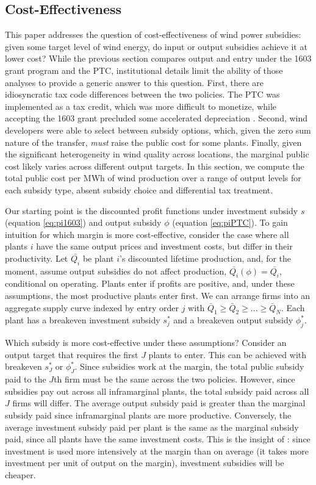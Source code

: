 \documentclass[12pt]{article}
\begin{document}
\subsection{Cost-Effectiveness \label{sec:costEffectiveness}}

This paper addresses the question of cost-effectiveness of wind power subsidies: given some target level of wind energy, do input or output subsidies achieve it at lower cost? While the previous section compares output and entry under the 1603 grant program and the PTC, institutional details limit the ability of those analyses to provide a generic answer to this question. First, there are idiosyncratic tax code differences between the two policies. The PTC was implemented as a tax credit, which was more difficult to monetize, while accepting the 1603 grant precluded some accelerated depreciation \citep{johnston_nonrefundable_2019}. Second, wind developers were able to select between subsidy options, which, given the zero sum nature of the transfer, \emph{must} raise the public cost for some plants. Finally, given the significant heterogeneity in wind quality across locations, the marginal public cost likely varies across different output targets. In this section, we compute the total public cost per MWh of wind production over a range of output levels for each subsidy type, absent subsidy choice and differential tax treatment. 

Our starting point is the discounted profit functions under investment subsidy $s$ (equation \ref{eq:pi1603}) and output subsidy $\phi$ (equation \ref{eq:piPTC}). To gain intuition for which margin is more cost-effective, consider the case where all plants $i$ have the same output prices and investment costs, but differ in their productivity. Let $\bar{Q_i}$ be plant $i$'s discounted lifetime production, and, for the moment, assume output subsidies do not affect production, $\bar{Q_i}(\phi) = \bar{Q_i}$, conditional on operating. Plants enter if profits are positive, and, under these assumptions, the most productive plants enter first. We can arrange firms into an aggregate supply curve indexed by entry order $j$ with $\bar{Q}_{1} \ge \bar{Q}_{2} \ge ... \ge \bar{Q}_{N}$. Each plant has a breakeven investment subsidy $s^*_j$ and a breakeven output subsidy $\phi^*_j$.

Which subsidy is more cost-effective under these assumptions? Consider an output target that requires the first $J$ plants to enter. This can be achieved with breakeven $s^*_J$ or $\phi^*_J$. Since subsidies work at the margin, the total public subsidy paid to the $J$th firm must be the same across the two policies. However, since subsidies pay out across all inframarginal plants, the total subsidy paid across all $J$ firms will differ. The average output subsidy paid is greater than the marginal subsidy paid since inframarginal plants are more productive. Conversely, the average investment subsidy paid per plant is the same as the marginal subsidy paid, since all plants have the same investment costs. This is the insight of \citet{parish_relative_1982}: since investment is used more intensively at the margin than on average (it takes more investment per unit of output on the margin), investment subsidies will be cheaper. 
\end{document}
